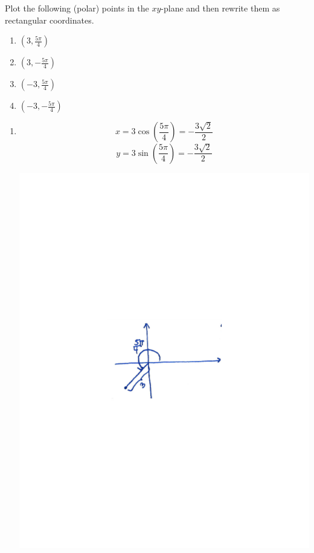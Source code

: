 \documentclass[noinstructornotes]{ximera}
\begin{document}
\begin{problem}
Plot the following (polar) points in the $xy$-plane and then rewrite them as rectangular coordinates.
	\begin{multicols}{4}
	\begin{enumerate}
	\item  $\left( 3, \frac{5 \pi}{4}   \right) $
	\item  $\left( 3, - \frac{5 \pi}{4}   \right) $
	\item  $\left( -3, \frac{5 \pi}{4}   \right) $
	\item  $\left( -3, - \frac{5 \pi}{4}   \right) $
	\end{enumerate}
	\end{multicols}
	
	\begin{freeResponse}
	\begin{enumerate}
	\item  
		\[
		x = 3 \cos \left( \frac{5 \pi}{4} \right) = - \frac{3 \sqrt{2}}{2}
		\]
		\[
		y = 3 \sin \left( \frac{5 \pi}{4} \right) = - \frac{3 \sqrt{2}}{2}
		\]
		
		\begin{image}
		\includegraphics[trim= 170 320 170 320, scale=0.7]{Figure11-2-2.pdf}
		\end{image}
	

\end{enumerate}
\end{freeResponse}
\end{problem}
\end{document}
